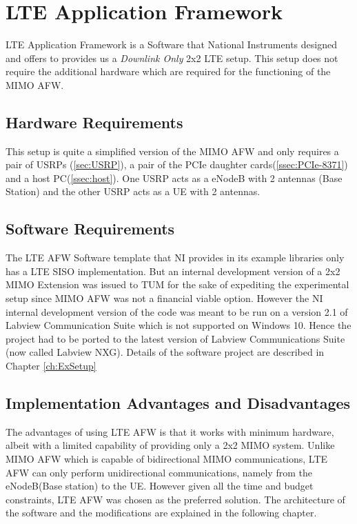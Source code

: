 \section{LTE Application Framework}\label{sec:LTEAFW}

        LTE Application Framework is a Software that National Instruments designed and offers to provides us a \emph{Downlink Only} 2x2 LTE setup. This setup does not require the additional hardware which are required for the functioning of the MIMO AFW.

        \subsection{Hardware Requirements}\label{ssec:LTEAFWHW}
        This setup is quite a simplified version of the MIMO AFW and only requires a pair of USRPs (\ref{sec:USRP}), a pair of the PCIe daughter cards(\ref{ssec:PCIe-8371}) and a host PC(\ref{ssec:host}). One USRP acts as a eNodeB with 2 antennas (Base Station) and the other USRP acts as a UE with 2 antennas.

        \subsection{Software Requirements}\label{ssec:LTEAFWSW}
        The LTE AFW Software template that NI provides in its example libraries only has a LTE SISO implementation. But an internal development version of a 2x2 MIMO Extension was issued to TUM for the sake of expediting the experimental setup since MIMO AFW was not a financial viable option. However the NI internal development version of the code was meant to be run on a version 2.1 of Labview Communication Suite which is not supported on Windows 10. Hence the project had to be ported to the latest version of Labview Communications Suite (now called Labview NXG). Details of the software project are described in Chapter \ref{ch:ExSetup}

        \subsection{Implementation Advantages and Disadvantages}\label{ssec:LTEAFWADVDISADV}
        The advantages of using LTE AFW is that it works with minimum hardware, albeit with a limited capability of providing only a 2x2 MIMO system. Unlike MIMO AFW which is capable of bidirectional MIMO communications, LTE AFW can only perform unidirectional communications, namely from the eNodeB(Base station) to the UE. However given all the time and budget constraints, LTE AFW was chosen as the preferred solution. The architecture of the software and the modifications are explained in the following chapter.


